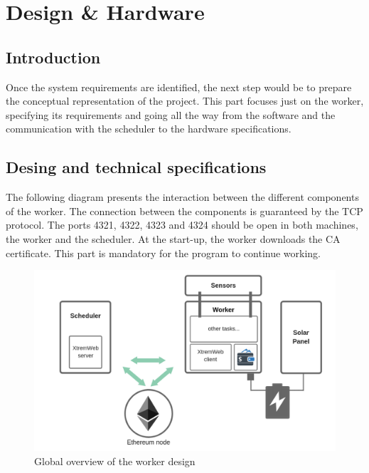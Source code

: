 

\chapter{Design \& Hardware}

\section{Introduction}
    Once the system requirements are identified, the next step would be to prepare the conceptual representation
    of the project. This part focuses just on the worker, specifying its requirements and going all the way
    from the software and the communication with the scheduler to the hardware specifications.

\section{Desing and technical specifications}

    The following diagram presents the interaction between the different components of the worker.
    The connection between the components is guaranteed by the TCP protocol.
    The ports 4321, 4322, 4323 and 4324 should be open in both machines, the worker and the scheduler.
    At the start-up, the worker downloads the CA certificate. This part is mandatory for the program
    to continue working.

    \clearpage

    \begin{figure}[!h]\centering
        \includegraphics[width=.9\columnwidth]{5-Design/figs/worker-diagram.png}
        \caption{Global overview of the worker design}
    \end{figure}

